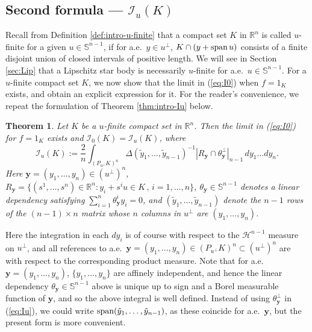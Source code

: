 \documentclass[11pt]{article}
\newtheorem{thm}{Theorem}[section]
\theoremstyle{definition}
\theoremstyle{proof}
\DeclareMathOperator{\+}{\mathop{\tilde{+}}}
\DeclareMathOperator{\sspan}{\textnormal{span}}
\newcommand{\R}{\mathbb{R}}
\renewcommand{\S}{\mathbb{S}}
\renewcommand{\H}{\mathcal{H}}
\newcommand{\I}{\mathcal{I}}
\newcommand{\y}{\mathbf{y}}
\numberwithin{equation}{section}
\numberwithin{equation}{section}
\begin{document}
\subsection{Second formula --- $\I_u(K)$}

Recall from Definition \ref{def:intro-u-finite} that a compact set $K$ in $\R^n$ is called $u$-finite for a given $u \in \S^{n-1}$, if for a.e.~$y \in u^{\perp}$, $K \cap (y + \sspan u)$ consists of a finite disjoint union of closed intervals of positive length. We will see in Section \ref{sec:Lip} that a Lipschitz star body is necessarily $u$-finite for a.e.~$u \in \S^{n-1}$. For a $u$-finite compact set $K$, we now show that the limit in (\ref{eq:I0}) when $f = 1_K$ exists, and obtain an explicit expression for it. For the reader's convenience, we repeat the formulation of Theorem \ref{thm:intro-Iu} below. 

\begin{thm} \label{thm:Iu}
Let $K$ be a $u$-finite compact set in $\R^n$. 
Then the limit in (\ref{eq:I0}) for $f = 1_K$ exists and $\I_0(K) = \I_u(K)$, where
\begin{equation} \label{eq:Iu}
\I_u(K) := \frac{2}{n}\int_{(P_{u^\perp} K)^n} \Delta(\tilde y_1,\ldots,\tilde y_{n-1})^{-1} |R_\y \cap \theta_\y^{\perp}|_{n-1} \, dy_1 \ldots dy_n .
\end{equation}
Here $\y = (y_1,\ldots,y_n) \in (u^{\perp})^n$, $R_\y = \{ (s^1,\ldots,s^n)  \in \R^n :  y_i + s^i u \in K \, , \,  i=1,\ldots,n\}$, $\theta_\y \in \S^{n-1}$ denotes a linear dependency satisfying $\sum_{i=1}^n \theta_\y^i y_i = 0$, and $(\tilde y_1,\ldots,\tilde y_{n-1})$ denote the $n-1$ rows of the $(n-1) \times n$ matrix whose $n$ columns in $u^{\perp}$ are $(y_1,\ldots,y_n)$. 
\end{thm}

Here the integration in each $dy_i$ is of course with respect to the $\H^{n-1}$ measure on $u^{\perp}$, and all references to a.e.~$\y=(y_1,\ldots,y_n) \in (P_{u^{\perp}} K)^n \subset (u^\perp)^n$ are with respect to the corresponding product measure. 
Note that for a.e.~$\y=(y_1,\ldots,y_n)$, $\{y_1,\ldots,y_n\}$ are affinely independent, and hence the linear dependency $\theta_\y \in \S^{n-1}$  above is unique up to sign and a Borel measurable function of $\y$, and so the above integral is well defined. Instead of using $\theta_\y^{\perp}$ in (\ref{eq:Iu}), we could write $\sspan(\tilde y_1,\ldots,\tilde y_{n-1})$,
as these coincide for a.e.~$\y$, but the present form is more convenient. 
\end{document}
